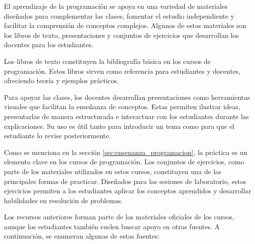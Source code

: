 \documentclass{article}
\begin{document}
El aprendizaje de la programación se apoya en una variedad de materiales diseñados para complementar las clases, fomentar el estudio independiente y facilitar la comprensión de conceptos complejos. Algunos de estos materiales son los libros de texto, presentaciones y conjuntos de ejercicios que desarrollan los docentes para los estudiantes.

Los libros de texto constituyen la bibliografía básica en los cursos de programación. Estos libros sirven como referencia para estudiantes y docentes, ofreciendo teoría y ejemplos prácticos.

Para apoyar las clases, los docentes desarrollan presentaciones como herramientas visuales que facilitan la enseñanza de conceptos. Estas permiten ilustrar ideas, presentarlas de manera estructurada e interactuar con los estudiantes durante las explicaciones. Su uso es útil tanto para introducir un tema como para que el estudiante lo revise posteriormente.  

Como se menciona en la sección \ref{sec:ensenanza_programacion}, la práctica es un elemento clave en los cursos de programación. Los conjuntos de ejercicios, como parte de los materiales utilizados en estos cursos, constituyen una de las principales formas de practicar. Diseñados para las sesiones de laboratorio, estos ejercicios permiten a los estudiantes aplicar los conceptos aprendidos y desarrollar habilidades en resolución de problemas.

Los recursos anteriores forman parte de los materiales oficiales de los cursos, aunque los estudiantes también suelen buscar apoyo en otras fuentes. A continuación, se enumeran algunas de estas fuentes:
\end{document}
